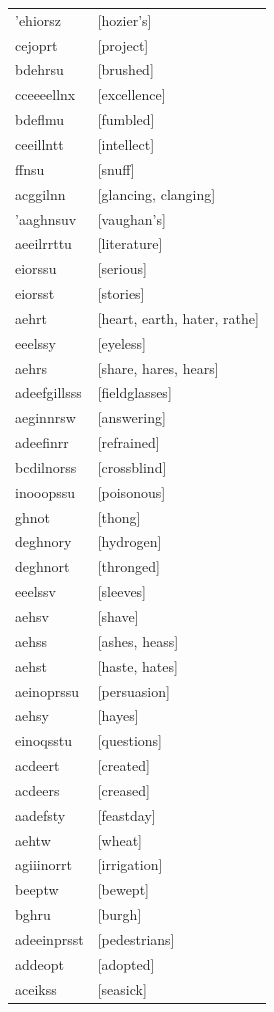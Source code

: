 \documentclass{article}
\begin{document}
\begin{tabular}{ll}
'ehiorsz & [hozier's] \\
cejoprt & [project] \\
bdehrsu & [brushed] \\
cceeeellnx & [excellence] \\
bdeflmu & [fumbled] \\
ceeillntt & [intellect] \\
ffnsu & [snuff] \\
acggilnn & [glancing, clanging] \\
'aaghnsuv & [vaughan's] \\
aeeilrrttu & [literature] \\
eiorssu & [serious] \\
eiorsst & [stories] \\
aehrt & [heart, earth, hater, rathe] \\
eeelssy & [eyeless] \\
aehrs & [share, hares, hears] \\
adeefgillsss & [fieldglasses] \\
aeginnrsw & [answering] \\
adeefinrr & [refrained] \\
bcdilnorss & [crossblind] \\
inooopssu & [poisonous] \\
ghnot & [thong] \\
deghnory & [hydrogen] \\
deghnort & [thronged] \\
eeelssv & [sleeves] \\
aehsv & [shave] \\
aehss & [ashes, heass] \\
aehst & [haste, hates] \\
aeinoprssu & [persuasion] \\
aehsy & [hayes] \\
einoqsstu & [questions] \\
acdeert & [created] \\
acdeers & [creased] \\
aadefsty & [feastday] \\
aehtw & [wheat] \\
agiiinorrt & [irrigation] \\
beeptw & [bewept] \\
bghru & [burgh] \\
adeeinprsst & [pedestrians] \\
addeopt & [adopted] \\
aceikss & [seasick] \\

\end{tabular}
\end{document}
